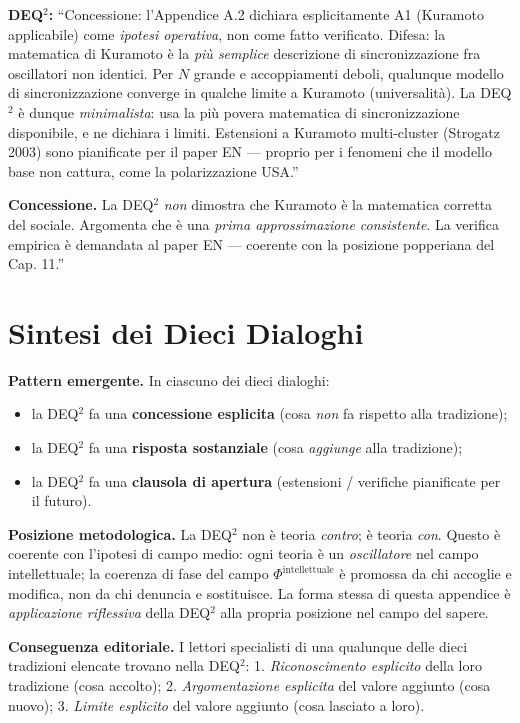 \textbf{DEQ$^2$:} ``Concessione: l'Appendice A.2 dichiara esplicitamente A1
(Kuramoto applicabile) come \emph{ipotesi operativa}, non come fatto
verificato. Difesa: la matematica di Kuramoto è la \emph{più semplice}
descrizione di sincronizzazione fra oscillatori non identici. Per \(N\)
grande e accoppiamenti deboli, qualunque modello di sincronizzazione
converge in qualche limite a Kuramoto (universalità). La DEQ$^2$ è dunque
\emph{minimalista}: usa la più povera matematica di sincronizzazione
disponibile, e ne dichiara i limiti. Estensioni a Kuramoto multi-cluster
(Strogatz 2003) sono pianificate per il paper EN --- proprio per i
fenomeni che il modello base non cattura, come la polarizzazione USA.''

\textbf{Concessione.} La DEQ$^2$ \emph{non} dimostra che Kuramoto è la
matematica corretta del sociale. Argomenta che è una \emph{prima
approssimazione consistente}. La verifica empirica è demandata al paper
EN --- coerente con la posizione popperiana del Cap. 11.''



\section{Sintesi dei Dieci Dialoghi}\label{sintesi-dei-dieci-dialoghi}

\Proved{} \textbf{Pattern emergente.} In ciascuno dei dieci dialoghi:

\begin{itemize}
\tightlist
\item
  la DEQ$^2$ fa una \textbf{concessione esplicita} (cosa \emph{non} fa
  rispetto alla tradizione);
\item
  la DEQ$^2$ fa una \textbf{risposta sostanziale} (cosa \emph{aggiunge}
  alla tradizione);
\item
  la DEQ$^2$ fa una \textbf{clausola di apertura} (estensioni / verifiche
  pianificate per il futuro).
\end{itemize}

\Hypoth{} \textbf{Posizione metodologica.} La DEQ$^2$ non è teoria
\emph{contro}; è teoria \emph{con}. Questo è coerente con l'ipotesi di
campo medio: ogni teoria è un \emph{oscillatore} nel campo
intellettuale; la coerenza di fase del campo
\(\Phi^{\text{intellettuale}}\) è promossa da chi accoglie e modifica,
non da chi denuncia e sostituisce. La forma stessa di questa appendice è
\emph{applicazione riflessiva} della DEQ$^2$ alla propria posizione nel
campo del sapere.

\Proved{} \textbf{Conseguenza editoriale.} I lettori specialisti di una
qualunque delle dieci tradizioni elencate trovano nella DEQ$^2$: 1.
\emph{Riconoscimento esplicito} della loro tradizione (cosa accolto); 2.
\emph{Argomentazione esplicita} del valore aggiunto (cosa nuovo); 3.
\emph{Limite esplicito} del valore aggiunto (cosa lasciato a loro).



